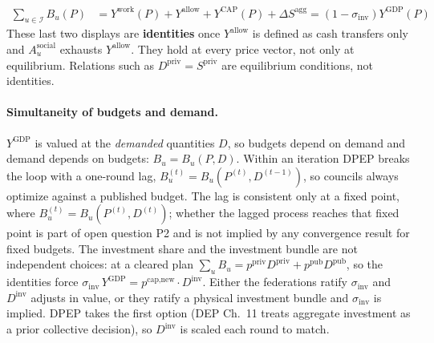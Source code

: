 \documentclass[10pt,twoside,openany]{book}
\theoremstyle{dpepstyle}
\begin{document}
\begin{enumerate}[leftmargin=1.8em,itemsep=3pt]
\begin{align}
    \sum_{u \in \mathcal{I}} B_u(P) &= Y^{\text{work}}(P) + Y^{\text{allow}} + Y^{\text{CAP}}(P) + \Delta S^{\text{agg}} = (1 - \sigma_{\text{inv}}) Y^{\text{GDP}}(P) \label{eq:warranted-budget}
  \end{align}
These last two displays are \textbf{identities} once $Y^{\text{allow}}$ is defined as cash transfers only and $A_u^{\text{social}}$ exhausts $Y^{\text{allow}}$. They hold at every price vector, not only at equilibrium. Relations such as $D^{\text{priv}}=S^{\text{priv}}$ are equilibrium conditions, not identities.
\end{enumerate}

\paragraph{Simultaneity of budgets and demand.}
$Y^{\text{GDP}}$ is valued at the \emph{demanded} quantities $D$, so budgets depend on demand and demand depends on budgets: $B_u = B_u(P, D)$. Within an iteration DPEP breaks the loop with a one-round lag, $B_u^{(t)} = B_u(P^{(t)}, D^{(t-1)})$, so councils always optimize against a published budget. The lag is consistent only at a fixed point, where $B_u^{(t)} = B_u(P^{(t)}, D^{(t)})$; whether the lagged process reaches that fixed point is part of open question P2 and is not implied by any convergence result for fixed budgets. The investment share and the investment bundle are not independent choices: at a cleared plan $\sum_u B_u = p^{\text{priv}}D^{\text{priv}} + p^{\text{pub}}D^{\text{pub}}$, so the identities force $\sigma_{\text{inv}}\, Y^{\text{GDP}} = p^{\text{cap,new}} \cdot D^{\text{inv}}$. Either the federations ratify $\sigma_{\text{inv}}$ and $D^{\text{inv}}$ adjusts in value, or they ratify a physical investment bundle and $\sigma_{\text{inv}}$ is implied. DPEP takes the first option (DEP Ch.~11 treats aggregate investment as a prior collective decision), so $D^{\text{inv}}$ is scaled each round to match.
\end{document}
